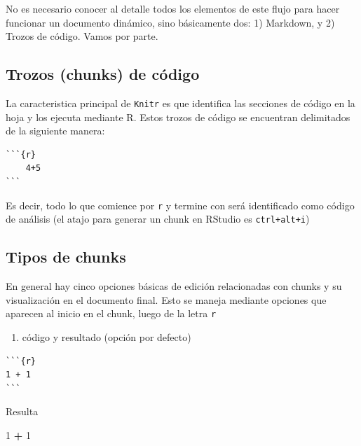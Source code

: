 \documentclass[
  11pt,
]{book}
\newenvironment{Shaded}{\begin{snugshade}}{\end{snugshade}}
\newcommand{\DecValTok}[1]{\textcolor[rgb]{0.00,0.00,0.81}{#1}}
\newcommand{\OperatorTok}[1]{\textcolor[rgb]{0.81,0.36,0.00}{\textbf{#1}}}
\newcommand{\StringTok}[1]{\textcolor[rgb]{0.31,0.60,0.02}{#1}}
\providecommand{\tightlist}{%
  \setlength{\itemsep}{0pt}\setlength{\parskip}{0pt}}
\begin{document}
No es necesario conocer al detalle todos los elementos de este flujo para hacer funcionar un documento dinámico, sino básicamente dos: 1) Markdown, y 2) Trozos de código. Vamos por parte.

\hypertarget{trozos-chunks-de-cuxf3digo}{%
\subsection{Trozos (chunks) de código}\label{trozos-chunks-de-cuxf3digo}}

La caracteristica principal de \texttt{Knitr} es que identifica las secciones de código en la hoja y los ejecuta mediante R. Estos trozos de código se encuentran delimitados de la siguiente manera:

\begin{verbatim}
```{r}
    4+5
```
\end{verbatim}

Es decir, todo lo que comience por \texttt{\textasciigrave{}\textasciigrave{}\textasciigrave{}r} y termine con \texttt{\textasciigrave{}\textasciigrave{}\textasciigrave{}} será identificado como código de análisis (el atajo para generar un chunk en RStudio es \texttt{ctrl+alt+i})

\hypertarget{tipos-de-chunks}{%
\subsection{Tipos de chunks}\label{tipos-de-chunks}}

En general hay cinco opciones básicas de edición relacionadas con chunks y su visualización en el documento final. Esto se maneja mediante opciones que aparecen al inicio en el chunk, luego de la letra \texttt{r}

\begin{enumerate}
\def\labelenumi{\arabic{enumi}.}
\tightlist
\item
  código y resultado (opción por defecto)
\end{enumerate}

\begin{verbatim}
```{r}
1 + 1
```
\end{verbatim}

Resulta

\begin{Shaded}
\begin{Highlighting}[]
\DecValTok{1} \OperatorTok{+}\StringTok{ }\DecValTok{1}
\end{Highlighting}
\end{Shaded}
\end{document}
